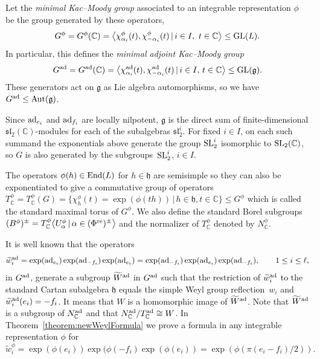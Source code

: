 \documentclass[pdftex]{sigma}
\numberwithin{equation}{section}
\def\C{{\mathbb C}}
\def\a{\alpha}
\def\wtil{\widetilde w}
\def\Wtil{\widetilde W}
\def\la{\langle}
\def\ra{\rangle}
\def\g{\mathfrak{g}}
\def\h{\mathfrak{h}}
\def\fh{\mathfrak{h}}
\def\fsl{\mathfrak{sl}}
\begin{document}
\begin{Definition} \label{definition:Kac--Moody_groups} Let the {\it minimal Kac--Moody group} associated to an integrable representation
$\phi$ be the group generated by these operators,
\[G^\phi = G^\phi(\C)=\big\la \chi^\phi_{{\a}_i}(t), \chi^\phi_{{-\a}_i}(t)\,|\, i\in I,\ t\in\C\big\ra\leq {\rm GL}(L).\]
In particular, this defines the {\it minimal adjoint Kac--Moody group}
\begin{gather}\label{equation:adjoint_Kac_Moody_group}
G^{\rm ad} = G^{\rm ad}(\C)=\big\la \chi^{\rm ad}_{{\a}_i}(t), \chi^{\rm ad}_{{-\a}_i}(t)\,|\, i\in I,\, t\in\C\big\ra\leq {\rm GL}(\g).
\end{gather}
These generators act on $\g$ as Lie algebra automorphisms, so we have $G^{\rm ad}\leq {\rm Aut}(\g)$.
\end{Definition}

Since ${\rm ad}_{e_i}$ and ${\rm ad}_{f_i}$ are locally nilpotent, $\g$ is the direct sum of finite-dimensional $\fsl_2(\C)$-modules for each of the subalgebras $\fsl_2^i$. For fixed $i\in I$, on each such summand the exponentials above generate the group ${\rm SL}_2^i$ isomorphic to ${\rm SL}_2(\C)$, so $G$ is also generated by the subgroups~${\rm SL}_2^i$, $i\in I$.

The operators $\phi(h)\in {\rm End}(L)$ for $h\in\h$ are semisimple so they can also be exponentiated to give a commutative group of operators $T_\C^\phi = T_\C^\phi(G) = \big\{\chi^\phi_h(t) = \exp(\phi(th))\, |\, h\in\h, t\in\C\big\}\leq G^\phi$ which is called the standard maximal torus of $G^\phi$. We also define the standard Borel subgroups $(B^\phi)^\pm = T_\C^\phi\big\la U^\phi_\a \, |\, \a\in(\Phi^{\rm re})^\pm\big\ra$ and the normalizer of $T_\C^\phi$ denoted by $N_\C^\phi$.

It is well known that the operators
\begin{gather*} \wtil^{\rm ad}_i = \exp({\rm ad}_{e_i})\exp({\rm ad}_{-f_i})\exp({\rm ad}_{e_i}) = \exp({\rm ad}_{-f_i})\exp({\rm ad}_{e_i})\exp({\rm ad}_{-f_i}) ,\qquad 1\leq i\leq\ell,\end{gather*}
in $G^{\rm ad}$, generate a subgroup
$\Wtil^{\rm ad}$ in $G^{\rm ad}$ such that the restriction of $\wtil^{\rm ad}_i$ to the standard Cartan subalgebra $\fh$ equals the simple Weyl group reflection~$w_i$ and $\wtil^{\rm ad}_i(e_i) = -f_i$. It means that $W$ is a homomorphic image of $\Wtil^{\rm ad}$.
Note that $\Wtil^{\rm ad}$ is a subgroup of $N_\C^{\rm ad}$ and that $N_\C^{\rm ad}/T_\C^{\rm ad} \cong W$. In Theorem~\ref{theorem:newWeylFormula}
we prove a formula in any integrable representation $\phi$ for
\[\wtil^{\phi}_i = \exp(\phi(e_i)) \exp(\phi(-f_i) \exp(\phi(e_i)) = \exp(\phi(\pi(e_i - f_i)/2)).\]
\end{document}
